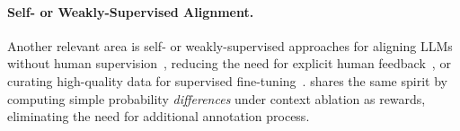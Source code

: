 \paragraph{Self- or Weakly-Supervised Alignment.}
Another relevant area is self- or weakly-supervised approaches for aligning LLMs without human supervision~\citep{kim2023aligning,yuan2024selfrewarding}, reducing the need for explicit human feedback~\citep{ouyang2022training}, or curating high-quality data for supervised fine-tuning~\citep{zhou2023lima}. \ours  shares the same spirit by computing simple probability \emph{differences} under context ablation as rewards, eliminating the need for additional annotation process. 